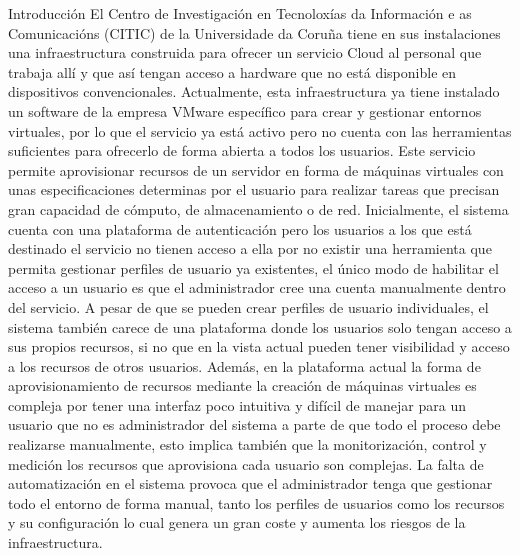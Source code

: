 \begin{chapter}{Introducción}
 El Centro de Investigación en Tecnoloxías da Información e as Comunicacións (CITIC) de la Universidade da Coruña tiene en sus instalaciones una infraestructura construida para ofrecer un servicio Cloud al personal que trabaja allí y que así tengan acceso a hardware que no está disponible en dispositivos convencionales. Actualmente, esta infraestructura ya tiene instalado un software de la empresa VMware específico para crear y gestionar entornos virtuales, por lo que el servicio ya está activo pero no cuenta con las herramientas suficientes para ofrecerlo de forma abierta a todos los usuarios. Este servicio permite aprovisionar recursos de un servidor en forma de máquinas virtuales con unas especificaciones determinas por el usuario para realizar tareas que precisan gran capacidad de cómputo, de almacenamiento o de red.
Inicialmente, el sistema cuenta con una plataforma de autenticación pero los usuarios a los que está destinado el servicio no tienen acceso a ella por no existir una herramienta que permita gestionar perfiles de usuario ya existentes, el único modo de habilitar el acceso a un usuario es que el administrador cree una cuenta manualmente dentro del servicio. A pesar de que se pueden crear perfiles de usuario individuales, el sistema también carece de una plataforma donde los usuarios solo tengan acceso a sus propios recursos, si no que en la vista actual pueden tener visibilidad y acceso a los recursos de otros usuarios. Además, en la plataforma actual la forma de aprovisionamiento de recursos mediante la creación de máquinas virtuales es compleja  por tener una interfaz poco intuitiva y difícil de manejar para un usuario que no es administrador del sistema a parte de que todo el proceso debe realizarse manualmente, esto implica también que la monitorización, control y medición los recursos que aprovisiona cada usuario son complejas. La falta de automatización en el sistema provoca que el administrador tenga que gestionar todo el entorno de forma manual, tanto los perfiles de usuarios como los recursos y su configuración lo cual genera un gran coste y aumenta los riesgos de la infraestructura.


\end{chapter}
